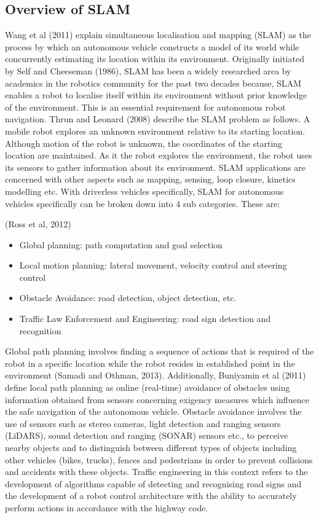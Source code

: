 \documentclass[a4paper, 12pt]{article}
\begin{document}
\subsection{Overview of SLAM}
Wang et al (2011) explain simultaneous localisation and mapping (SLAM) as the process by which an autonomous vehicle constructs a model of its world while concurrently estimating its location within its environment. Originally initiated by Self and Cheeseman (1986), SLAM has been a widely researched area by academics in the robotics community for the past two decades because, SLAM enables a robot to localise itself within its environment without prior knowledge of the environment. This is an essential requirement for autonomous robot navigation. Thrun and Leonard (2008) describe the SLAM problem as follows. A mobile robot explores an unknown environment relative to its starting location. Although motion of the robot is unknown, the coordinates of the starting location are maintained. As it the robot explores the environment, the robot uses its sensors to gather information about its environment. SLAM applications are concerned with other aspects such as mapping, sensing, loop closure, kinetics modelling etc. With driverless vehicles specifically, SLAM for autonomous vehicles specifically can be broken down into 4 sub categories. These are:

(Ross et al, 2012)
\begin{itemize}
 \item{Global planning: path computation and goal selection}
 \item{Local motion planning: lateral movement, velocity control and steering control}
 \item{Obstacle Avoidance: road detection, object detection, etc.}
 \item{Traffic Law Enforcement and Engineering: road sign detection and recognition}
\end{itemize}

\parskip 0.2in
Global path planning involves finding a sequence of actions that is required of the robot in a specific location while the robot resides in established point in the environment (Samadi and Othman, 2013). Additionally, Buniyamin et al (2011) define local path planning as online (real-time) avoidance of obstacles using information obtained from sensors concerning exigency measures which influence the safe navigation of the autonomous vehicle. Obstacle avoidance involves the use of sensors such as stereo cameras, light detection and ranging sensors (LiDARS), sound detection and ranging (SONAR) sensors etc., to perceive nearby objects and to distinguish between different types of objects including other vehicles (bikes, trucks), fences and pedestrians in order to prevent collisions and accidents with these objects. Traffic engineering in this context refers to the development of algorithms capable of detecting and recognising road signs and the development of a robot control architecture with the ability to accurately perform actions in accordance with the highway code. 
\end{document}
